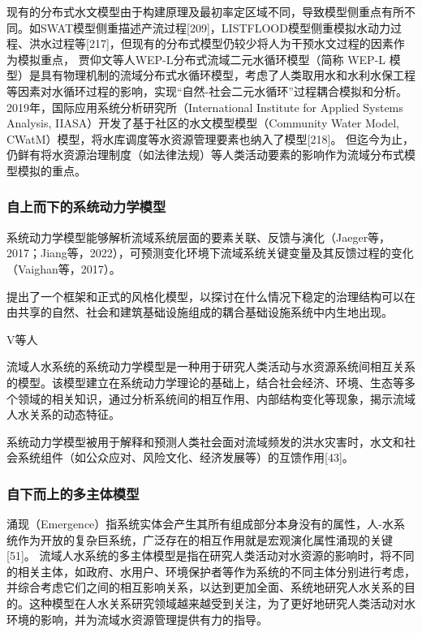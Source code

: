 现有的分布式水文模型由于构建原理及最初率定区域不同，导致模型侧重点有所不同。如SWAT模型侧重描述产流过程[209]，LISTFLOOD模型侧重模拟水动力过程、洪水过程等[217]，但现有的分布式模型仍较少将人为干预水文过程的因素作为模拟重点，
贾仰文等人WEP-L分布式流域二元水循环模型（简称 WEP-L 模型）是具有物理机制的流域分布式水循环模型，考虑了人类取用水和水利水保工程等因素对水循环过程的影响，实现“自然-社会二元水循环”过程耦合模拟和分析。 %
2019年，国际应用系统分析研究所（International Institute for Applied Systems Analysis, IIASA）开发了基于社区的水文模型模型（Community Water Model, CWatM）模型，将水库调度等水资源管理要素也纳入了模型[218]。
但迄今为止，仍鲜有将水资源治理制度（如法律法规）等人类活动要素的影响作为流域分布式模型模拟的重点。

\subsubsection*{自上而下的系统动力学模型}

系统动力学模型能够解析流域系统层面的要素关联、反馈与演化（Jaeger等，2017；Jiang等，2022），可预测变化环境下流域系统关键变量及其反馈过程的变化（Vaighan等，2017）。

\cite{muneepeerakul2017}提出了一个框架和正式的风格化模型，以探讨在什么情况下稳定的治理结构可以在由共享的自然、社会和建筑基础设施组成的耦合基础设施系统中内生地出现。

V等人

流域人水系统的系统动力学模型是一种用于研究人类活动与水资源系统间相互关系的模型。该模型建立在系统动力学理论的基础上，结合社会经济、环境、生态等多个领域的相关知识，通过分析系统间的相互作用、内部结构变化等现象，揭示流域人水关系的动态特征。

系统动力学模型被用于解释和预测人类社会面对流域频发的洪水灾害时，水文和社会系统组件（如公众应对、风险文化、经济发展等）的互馈作用[43]。

\subsubsection*{自下而上的多主体模型}
涌现（Emergence）指系统实体会产生其所有组成部分本身没有的属性，人-水系统作为开放的复杂巨系统，广泛存在的相互作用就是宏观演化属性涌现的关键[51]。
流域人水系统的多主体模型是指在研究人类活动对水资源的影响时，将不同的相关主体，如政府、水用户、环境保护者等作为系统的不同主体分别进行考虑，并综合考虑它们之间的相互影响关系，以达到更加全面、系统地研究人水关系的目的。这种模型在人水关系研究领域越来越受到关注，为了更好地研究人类活动对水环境的影响，并为流域水资源管理提供有力的指导。

